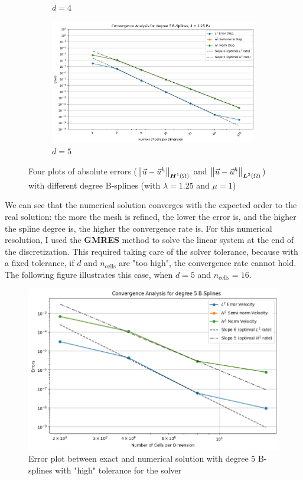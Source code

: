 \documentclass[a4paper,12pt,twoside]{report}
\begin{document}
\begin{figure}[!h]
\begin{subfigure}[b]{0.49\textwidth}
		\caption{$d=4$}
		\label{fig:deg4_NMDHBC}
	\end{subfigure}
	\begin{subfigure}[b]{0.49\textwidth}
		\centering
		\includegraphics[width=\textwidth]{figures/figures_non_mixed_DH/convergence_plot_degree_5_lambda=1.25.png}
		\caption{$d=5$}
		\label{fig:deg5_NMDHBC}
	\end{subfigure}
	\caption{Four plots of absolute errors ($\norm{\vec u - \vec u^h}_{\boldsymbol H^1(\Omega)}$ and $\norm{\vec u - \vec u^h}_{\boldsymbol L^2(\Omega)}$) with different degree B-splines (with $\lambda = 1.25$ and $\mu = 1$)}
	\label{fig:four_errors_graphs_1}
\end{figure}

We can see that the numerical solution converges with the expected order to the real solution: the more the mesh is refined, the lower the error is, and the higher the spline degree is, the higher the convergence rate is. 
For this numerical resolution, I used the \textbf{GMRES} method to solve the linear system at the end of the discretization. This required taking care of the solver tolerance, because with a fixed tolerance, if $d$ and $n_{\text{cells}}$ are "too high", the convergence rate cannot hold. The following figure illustrates this case, when $d=5$ and $n_{\text{cells}} = 16$.

\newpage
\begin{figure}[!h]
	\centering
	\includegraphics[width=0.7\linewidth]{figures/degre5_nul}
	\caption{Error plot between exact and numerical solution with degree 5 B-splines with "high" tolerance for the solver}
\end{figure}
\end{document}
